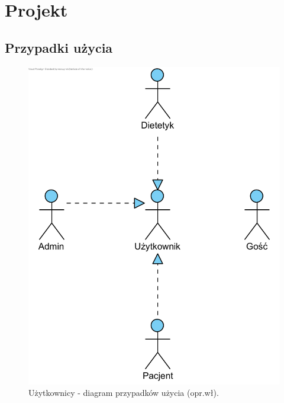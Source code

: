 \chapter{Projekt}

\section{Przypadki użycia}

\begin{minipage}{\textwidth}
    \begin{figure}[H]
        \centering\includegraphics[scale=0.55]{../uml/use_case_diagrams/users.png}
        \caption{Użytkownicy - diagram przypadków użycia (opr.wł).}\label{rysunek:use-case-diagram-users}
    \end{figure}
\end{minipage}


